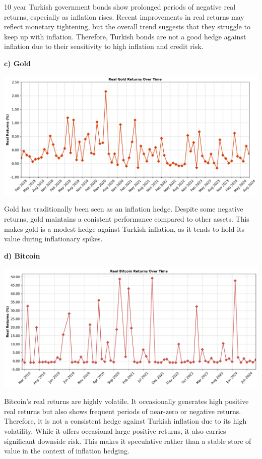 \documentclass[
]{article}
\begin{document}
10 year Turkish government bonds show prolonged periods of negative real returns, especially as inflation rises. Recent improvements in real returns may reflect monetary tightening, but the overall trend suggests that they struggle to keep up with inflation. Therefore, Turkish bonds are not a good hedge against inflation due to their sensitivity to high inflation and credit risk.

\textbf{c) Gold}

\includegraphics[width=\textwidth]{real_gold_returns.png}

Gold has traditionally been seen as an inflation hedge. Despite some negative returns, gold maintains a conistent performance compared to other assets. This makes gold is a modest hedge against Turkish inflation, as it tends to hold its value during inflationary spikes. 

\textbf{d) Bitcoin}

\includegraphics[width=\textwidth]{real_bitcoin_returns.png}

Bitcoin's real returns are highly volatile. It occasionally generates high positive real returns but also shows frequent periods of near-zero or negative returns. Therefore, it is not a consistent hedge against Turkish inflation due to its high volatility. While it offers occasional large positive returns, it also carries significant downside risk. This makes it speculative rather than a stable store of value in the context of inflation hedging.
\end{document}
